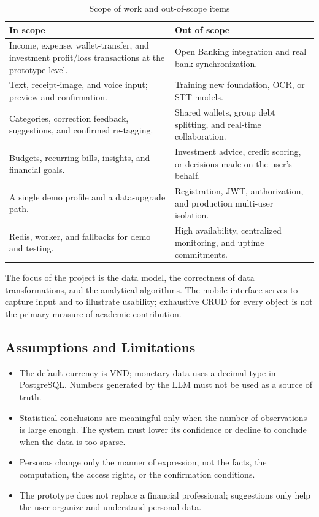 \begin{table}[H]
  \centering
  \caption{Scope of work and out-of-scope items}
  \label{tab:scope}
  \begin{tabularx}{\textwidth}{@{}Y Y@{}}
    \toprule
    \textbf{In scope} & \textbf{Out of scope} \\
    \midrule
    Income, expense, wallet-transfer, and investment profit/loss transactions at the prototype level. & Open Banking integration and real bank synchronization. \\
    Text, receipt-image, and voice input; preview and confirmation. & Training new foundation, OCR, or STT models. \\
    Categories, correction feedback, suggestions, and confirmed re-tagging. & Shared wallets, group debt splitting, and real-time collaboration. \\
    Budgets, recurring bills, insights, and financial goals. & Investment advice, credit scoring, or decisions made on the user's behalf. \\
    A single  demo profile and a data-upgrade path. & Registration, JWT, authorization, and production multi-user isolation. \\
    Redis, worker, and fallbacks for demo and testing. & High availability, centralized monitoring, and uptime commitments. \\
    \bottomrule
  \end{tabularx}
\end{table}

The focus of the project is the data model, the correctness of data
transformations, and the analytical algorithms. The mobile interface
serves to capture input and to illustrate usability; exhaustive CRUD for
every object is not the primary measure of academic contribution.

\subsection{Assumptions and Limitations}

\begin{itemize}
  \item The default currency is VND; monetary data uses a decimal type
  in PostgreSQL. Numbers generated by the LLM must not be used as a
  source of truth.
  \item Statistical conclusions are meaningful only when the number of
  observations is large enough. The system must lower its confidence or
  decline to conclude when the data is too sparse.
  \item Personas change only the manner of expression, not the facts,
  the computation, the access rights, or the confirmation conditions.
  \item The prototype does not replace a financial professional;
  suggestions only help the user organize and understand personal data.
\end{itemize}

